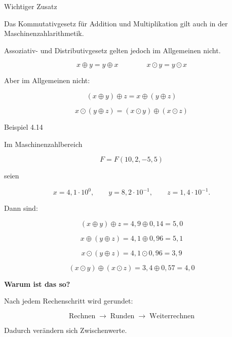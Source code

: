 \documentclass{beamer}
\begin{document}
\begin{frame}{Wichtiger Zusatz}

\small

Das Kommutativgesetz für Addition und Multiplikation gilt auch
in der Maschinenzahlarithmetik.

\vspace{0.6cm}

Assoziativ- und Distributivgesetz gelten jedoch
im Allgemeinen nicht.

\vspace{0.8cm}

\[
x\oplus y = y\oplus x
\qquad\qquad
x\odot y = y\odot x
\]

\vspace{0.6cm}

Aber im Allgemeinen nicht:

\[
(x\oplus y)\oplus z = x\oplus (y\oplus z)
\]

\[
x\odot (y\oplus z)= (x\odot y)\oplus (x\odot z)
\]

\end{frame}

\begin{frame}{Beispiel 4.14}

\scriptsize

Im Maschinenzahlbereich

\[
F=F(10,2,-5,5)
\]

seien

\[
x=4{,}1\cdot 10^{0},\qquad
y=8{,}2\cdot 10^{-1},\qquad
z=1{,}4\cdot 10^{-1}.
\]

\vspace{0.4cm}

Dann sind:

\[
(x\oplus y)\oplus z
=
4{,}9\oplus 0{,}14
=
5{,}0
\]

\[
x\oplus (y\oplus z)
=
4{,}1\oplus 0{,}96
=
5{,}1
\]

\[
x\odot (y\oplus z)
=
4{,}1\odot 0{,}96
=
3{,}9
\]

\[
(x\odot y)\oplus (x\odot z)
=
3{,}4\oplus 0{,}57
=
4{,}0
\]

\vspace{0.4cm}

\textbf{Warum ist das so?}

Nach jedem Rechenschritt wird gerundet:

\[
\text{Rechnen} \;\rightarrow\; \text{Runden} \;\rightarrow\; \text{Weiterrechnen}
\]

Dadurch verändern sich Zwischenwerte.

\end{frame}
\end{document}
